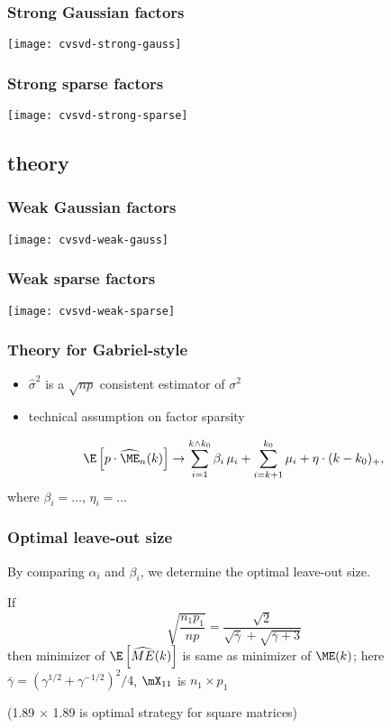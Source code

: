 \documentclass{beamer}
\begin{document}
\begin{frame}
  \frametitle{Strong Gaussian factors}
  \begin{center}
  \texttt{[image: cvsvd-strong-gauss]}
  \end{center}
\end{frame}

\begin{frame}
  \frametitle{Strong sparse factors}
  \begin{center}
  \texttt{[image: cvsvd-strong-sparse]}
  \end{center}
\end{frame}
\subsection{theory}

\begin{frame}
  \frametitle{Weak Gaussian factors}
  \begin{center}
  \texttt{[image: cvsvd-weak-gauss]}
  \end{center}
\end{frame}


\begin{frame}
  \frametitle{Weak sparse factors}
  \begin{center}
  \texttt{[image: cvsvd-weak-sparse]}
  \end{center}
\end{frame}

\begin{frame}
  \frametitle{Theory for Gabriel-style}
  \begin{itemize}
  \item $\hat \sigma^2$ is a $\sqrt{np}$ consistent estimator of $\sigma^2$
  \item technical assumption on factor sparsity
  \end{itemize}
  \begin{theorem}
  \[
\E \left[ p \cdot \widehat{\ME}_n(k) \right]
			\to
				\sum_{i=1}^{k \wedge k_0}
					\beta_i \, \mu_i
				+
				\sum_{i=k+1}^{k_0}
					\mu_i
				+
				\eta
				\cdot
				(k - k_0)_+,
  \]
  where $\beta_i = \ldots$, $\eta_i = \ldots$
  \end{theorem}
\end{frame}

\begin{frame}
  \frametitle{Optimal leave-out size}
  By comparing $\alpha_i$ and $\beta_i$, we determine the optimal leave-out size.
  \begin{theorem}
    If
    \[
       \sqrt{\frac{n_1 p_1}{n p}}
       =
       \frac{\sqrt{2}}{\sqrt{\bar \gamma} + \sqrt{\bar \gamma + 3}}
    \]
    then minimizer of $\E\left[\widehat{ME}(k)\right]$ is same as minimizer of $\ME(k)$;
    here
    \(
      \bar \gamma = (\gamma^{1/2} + \gamma^{-1/2})^2/4
    \),
    $\mX_{11}$ is $n_1 \times p_1$
  \end{theorem}
  (1.89 $\times$ 1.89 is optimal strategy for square matrices)
\end{frame}
\end{document}
